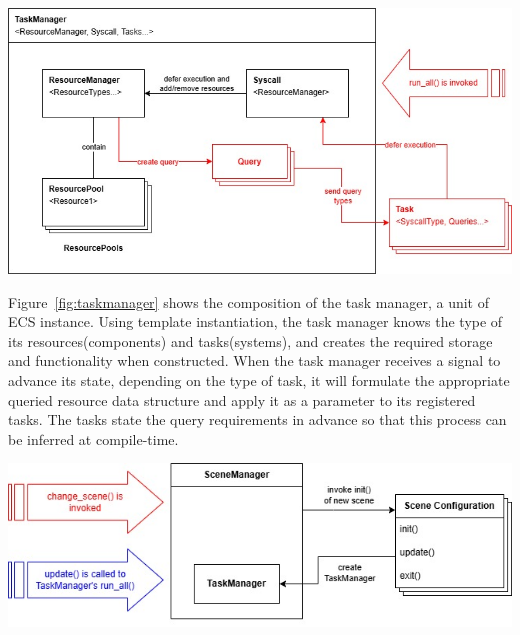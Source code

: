 \vspace{0.5cm}

\noindent
\begin{minipage}{\columnwidth}
    \centering
    \includegraphics[width=\columnwidth, keepaspectratio]{images/taskmanager}
    \label{fig:taskmanager}
\end{minipage}

\vspace{0.5cm}

\noindent Figure~\ref{fig:taskmanager} shows the composition of the task manager, a unit of ECS instance.
Using template instantiation, the task manager knows the type of its resources(components) and tasks(systems),
and creates the required storage and functionality when constructed.
When the task manager receives a signal to advance its state, depending on the type of task, it will
formulate the appropriate queried resource data structure and apply it as a parameter to its registered tasks.
The tasks state the query requirements in advance so that this process can be inferred at compile-time.

\vspace{0.5cm}

\noindent
\begin{minipage}{\columnwidth}
    \centering
    \includegraphics[width=\columnwidth, keepaspectratio]{images/scenemanager}
    \label{fig:scenemanager}
\end{minipage}

